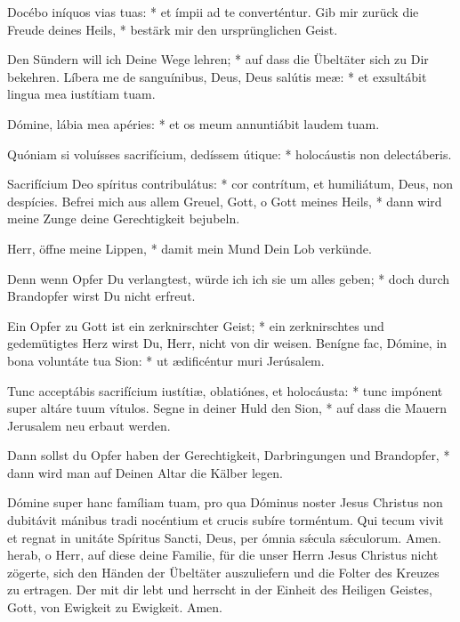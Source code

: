 \documentclass[fontsize=10pt,paper=A5,twoside,BCOR=1mm,DIV=21,headinclude]{scrarticle}
\begin{document}
\begin{paracol}{2}
\begin{psalmus}
Docébo iníquos vias tuas: * et ímpii ad te converténtur.
\switchcolumn
Gib mir zurück die Freude deines Heils, * bestärk mir den ursprünglichen Geist.

Den Sündern will ich Deine Wege lehren; * auf dass die Übeltäter sich zu Dir bekehren.
\switchcolumn*
Líbera me de sanguínibus, Deus, Deus salútis meæ: * et exsultábit lingua mea iustítiam tuam.

Dómine, lábia mea apéries: * et os meum annuntiábit laudem tuam.

Quóniam si voluísses sacrifícium, dedíssem útique: * holocáustis non delectáberis.

Sacrifícium Deo spíritus contribulátus: * cor contrítum, et humiliátum, Deus, non despícies.
\switchcolumn
Befrei mich aus allem Greuel, Gott, o Gott meines Heils, * dann wird meine Zunge deine Gerechtigkeit bejubeln.

Herr, öffne meine Lippen, * damit mein Mund Dein Lob verkünde.

Denn wenn Opfer Du verlangtest, würde ich ich sie um alles geben; * doch durch Brandopfer wirst Du nicht erfreut.

Ein Opfer zu Gott ist ein zerknirschter Geist; * ein zerknirschtes und gedemütigtes Herz wirst Du, Herr, nicht von dir weisen.
\switchcolumn*
Benígne fac, Dómine, in bona voluntáte tua Sion: * ut ædificéntur muri Jerúsalem.

Tunc acceptábis sacrifícium iustítiæ, oblatiónes, et holocáusta: * tunc impónent super altáre tuum vítulos.
\switchcolumn
Segne in deiner Huld den Sion, * auf dass die Mauern Jerusalem neu erbaut werden.

Dann sollst du Opfer haben der Gerechtigkeit, Darbringungen und Brandopfer, * dann wird man auf Deinen Altar die Kälber legen.
\end{psalmus}
\end{paracol}



\vspace{.3em}

\begin{paracol}{2}\pcb
{} Dómine super hanc famíliam tuam, pro qua Dóminus noster Jesus Christus non dubitávit mánibus tradi nocéntium et crucis subíre torméntum.
Qui tecum vivit et regnat in unitáte Spíritus Sancti, Deus, per ómnia s\'æcula s\'æculorum.
\R Amen.
	\switchcolumn
	 herab, o Herr, auf diese deine Familie, für die unser Herrn Jesus Christus nicht zögerte, sich den Händen der Übeltäter auszuliefern und die Folter des Kreuzes zu ertragen.
Der mit dir lebt und herrscht in der Einheit des Heiligen Geistes, Gott, von Ewigkeit zu Ewigkeit.
	\R Amen.
\end{paracol}
\end{document}
